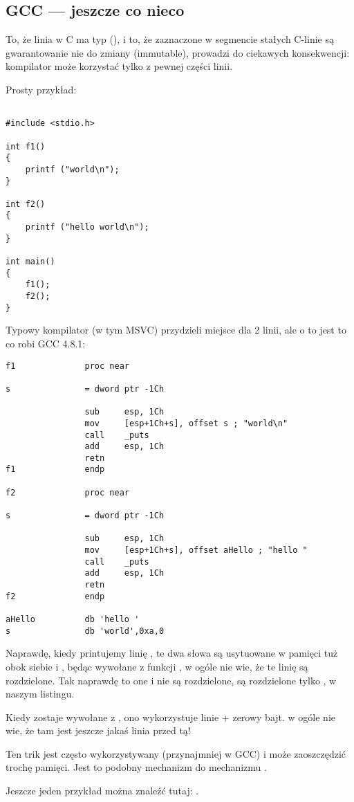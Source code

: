 \subsection{GCC --- jeszcze co nieco}
\label{use_parts_of_C_strings}

To, że  linia w C ma typ  (), 
i to, że zaznaczone w segmencie stałych C-linie są gwarantowanie nie do zmiany (immutable), 
prowadzi do ciekawych konsekwencji: kompilator może korzystać tylko z pewnej części linii.

Prosty przykład:

\begin{lstlisting}[style=customc]

#include <stdio.h>

int f1()
{
	printf ("world\n");
}

int f2()
{
	printf ("hello world\n");
}

int main()
{
	f1();
	f2();
}
\end{lstlisting}

Typowy kompilator \CCpp (w tym MSVC) przydzieli miejsce dla 2 linii, ale o to jest to co robi GCC 4.8.1:

\begin{lstlisting}[caption=GCC 4.8.1 + listing w IDA,style=customasmx86]
f1              proc near

s               = dword ptr -1Ch

                sub     esp, 1Ch
                mov     [esp+1Ch+s], offset s ; "world\n"
                call    _puts
                add     esp, 1Ch
                retn
f1              endp

f2              proc near

s               = dword ptr -1Ch

                sub     esp, 1Ch
                mov     [esp+1Ch+s], offset aHello ; "hello "
                call    _puts
                add     esp, 1Ch
                retn
f2              endp

aHello          db 'hello '
s               db 'world',0xa,0
\end{lstlisting}

Naprawdę, kiedy printujemy linię , 
te dwa słowa są usytuowane w pamięci tuż obok siebie i \puts, będąc wywołane z funkcji , w ogóle nie wie,
że te linię są rozdzielone. Tak naprawdę to one i nie są rozdzielone, są rozdzielone 
tylko , w naszym listingu.

Kiedy \puts zostaje wywołane z , ono wykorzystuje linie  + zerowy bajt. \puts w ogóle nie wie, że tam jest jeszcze jakaś linia przed tą!

Ten trik jest często wykorzystywany (przynajmniej w GCC) i może zaoszczędzić trochę pamięci.
Jest to podobny mechanizm do mechanizmu .

Jeszcze jeden przykład można znaleźć tutaj: .


